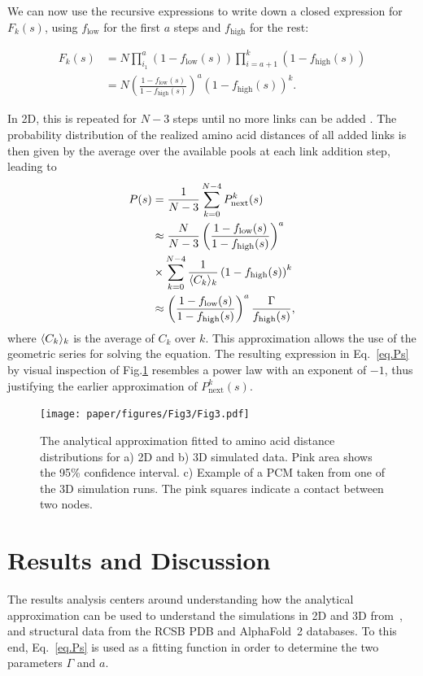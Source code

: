 \documentclass[
reprint,
twocolumn,
amsmath,amssymb,superscriptaddress,aps,
pre]{revtex4-1}
\DeclarePairedDelimiter{\evdel}{\langle}{\rangle}
\newcommand{\Pin}{P_{\mathrm{next}}}
\newcommand{\fhigh}{f_{\mathrm{high}}}
\newcommand{\flow}{f_{\mathrm{low}}}
\begin{document}
We can now use the recursive expressions to write down a closed expression for $F_k(s)$, using $\flow$ for the first $a$ steps and $\fhigh$ for the rest:

\begin{align}
    F_k(s)&=N\prod_{i_1}^a\left(1-\flow(s)\right)\prod_{i=a+1}^k\left(1-\fhigh(s)\right) \nonumber \\
    &= N\left(\frac{1-\flow(s)}{1-\fhigh(s)}\right)^a\left(1-\fhigh(s)\right)^{k}.
\end{align}

In 2D, this is repeated for $N-3$ steps until no more links can be added \cite{molkenthin2016scaling}.
The probability distribution of the realized amino acid distances of all added links is then given by the average over the available pools at each link addition step, leading to
\begin{align}
    P(s)&=\frac{1}{N-3}\sum_{k=0}^{N-4} \Pin^k(s) \nonumber \\
    &\approx \frac{N}{N-3}\left(\frac{1-\flow(s)}{1-\fhigh(s)}\right)^a \nonumber\\
&\times \sum_{k=0}^{N-4} \frac{1}{\evdel{C_k}_k} \left(1-\fhigh(s)\right)^{k} \nonumber \\
    &\approx \left(\frac{1-\flow(s)}{1-\fhigh(s)}\right)^a\frac{\Gamma}{\fhigh(s)},
    \label{eq.Ps}
\end{align}
where $\evdel{C_k}_k$ is the average of $C_k$ over $k$.
This approximation allows the use of the geometric series for solving the equation. 
The resulting expression in Eq.~\ref{eq.Ps} by visual inspection of Fig.\ref{fig:2d_sim} resembles a power law with an exponent of $-1$, thus justifying the earlier approximation of $\Pin^k(s)$.

 \begin{figure}[htb]
        \centering
	\texttt{[image: paper/figures/Fig3/Fig3.pdf]}
	    \caption{The analytical approximation fitted to amino acid distance distributions for a) 2D and b) 3D simulated data. Pink area shows the 95\% confidence interval. c) Example of a PCM taken from one of the 3D simulation runs. The pink squares indicate a contact between two nodes.}
        \label{fig:2d_sim}
\end{figure}


\section{Results and Discussion}\label{sec:results}
The results analysis centers around understanding how the analytical approximation can be used to understand the simulations in 2D and 3D from~\cite{molkenthin2016scaling,molkenthin2020self}, and structural data from the RCSB PDB and AlphaFold~2 databases. To this end, Eq.~\ref{eq.Ps} is used as a fitting function in order to determine the two parameters $\Gamma$ and $a$.
\end{document}
